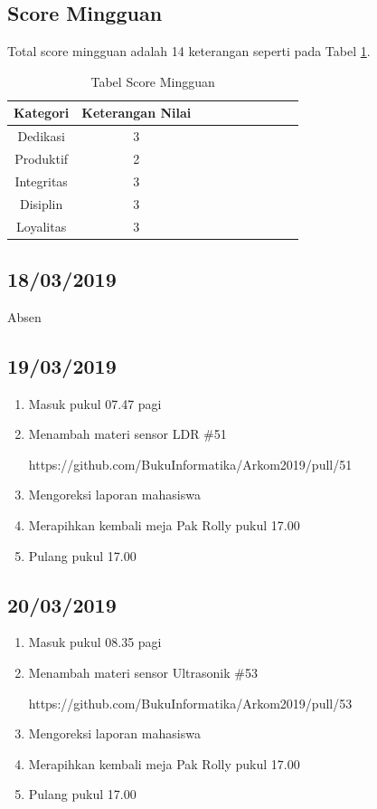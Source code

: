 \subsection{Score Mingguan}
Total score mingguan adalah 14 keterangan seperti pada Tabel \ref{table:scoremingguan2}.
\begin{table}[!ht]
\centering
\begin{tabular}{ |c|c|c|c|c|c|c|c|c|c| }
\hline
Kategori & Keterangan Nilai \\
\hline
Dedikasi & 3 \\
\hline
Produktif & 2 \\
\hline
Integritas & 3 \\
\hline
Disiplin & 3 \\
\hline
Loyalitas & 3 \\
\hline
\end{tabular}
\caption{Tabel Score Mingguan}
\label{table:scoremingguan2}
\end{table}

\subsection{18/03/2019}
Absen

\subsection{19/03/2019}
\begin{enumerate}
  \item Masuk pukul 07.47 pagi
  \item Menambah materi sensor LDR \#51
\par https://github.com/BukuInformatika/Arkom2019/pull/51
  \item Mengoreksi laporan mahasiswa
 \item Merapihkan kembali meja Pak Rolly pukul 17.00
  \item Pulang pukul 17.00 
\end{enumerate}

\subsection{20/03/2019}
\begin{enumerate}
  \item Masuk pukul 08.35 pagi
  \item Menambah materi sensor Ultrasonik \#53
\par https://github.com/BukuInformatika/Arkom2019/pull/53
  \item Mengoreksi laporan mahasiswa
 \item Merapihkan kembali meja Pak Rolly pukul 17.00
  \item Pulang pukul 17.00 
\end{enumerate}

